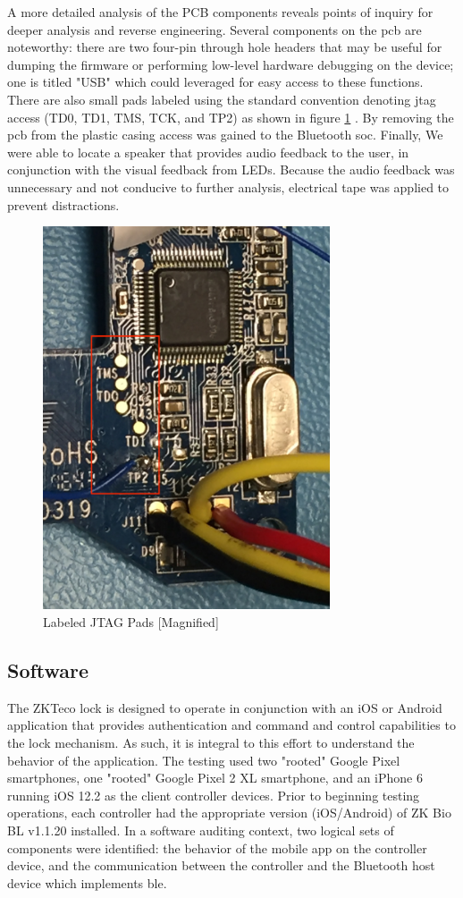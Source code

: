 \documentclass[conference]{IEEEtran}
\begin{document}
A more detailed analysis of the PCB components reveals points of inquiry for deeper analysis and reverse engineering. Several components on the \gls{pcb} are noteworthy: there are two four-pin through hole headers that may be useful for dumping the firmware or performing low-level hardware debugging on the device; one is titled "USB" which could leveraged for easy access to these functions. There are also small pads labeled using the standard convention denoting \gls{jtag} access (TD0, TD1, TMS, TCK, and TP2) as shown in figure \ref{fig:jtag} \cite{IEEE2013}. By removing the \gls{pcb} from the plastic casing access was gained to the Bluetooth \gls{soc}. Finally, We were able to locate a speaker that provides audio feedback to the user, in conjunction with the visual feedback from LEDs.  Because the audio feedback was unnecessary and not conducive to further analysis, electrical tape was applied to prevent distractions.


\begin{figure}[ht]
  \includegraphics[width=8.5cm]{images/JTAG2.jpg}
  \caption{Labeled JTAG Pads [Magnified]}
  \label{fig:jtag}
\end{figure}

\subsection{Software}

The ZKTeco lock is designed to operate in conjunction with an iOS or Android application that provides authentication and command and control capabilities to the lock mechanism.  As such, it is integral to this effort to understand the behavior of the application.  The testing used two "rooted" Google Pixel smartphones, one "rooted" Google Pixel 2 XL smartphone, and an iPhone 6 running iOS 12.2 as the client controller devices.  Prior to beginning testing operations, each controller had the appropriate version (iOS/Android) of ZK Bio BL v1.1.20 installed.  In a software auditing context, two logical sets of components were identified: the behavior of the mobile app on the controller device, and the communication between the controller and the Bluetooth host device which implements \gls{ble}.
\end{document}
